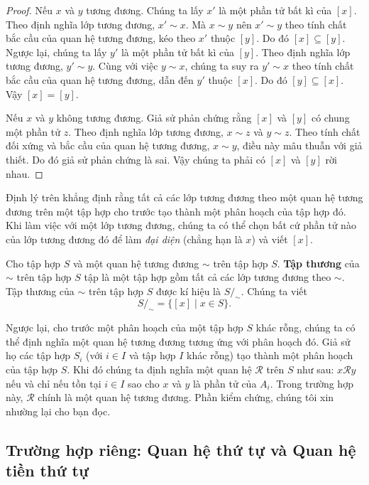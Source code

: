 \begin{proof}
    Nếu $x$ và $y$ tương đương. Chúng ta lấy $x'$ là một phần tử bất kì của $[x]$. Theo định nghĩa lớp tương đương, $x'\sim x$. Mà $x\sim y$ nên $x'\sim y$ theo tính chất bắc cầu của quan hệ tương đương, kéo theo $x'$ thuộc $[y]$. Do đó $[x]\subseteq [y]$. Ngược lại, chúng ta lấy $y'$ là một phần tử bất kì của $[y]$. Theo định nghĩa lớp tương đương, $y'\sim y$. Cùng với việc $y\sim x$, chúng ta suy ra $y'\sim x$ theo tính chất bắc cầu của quan hệ tương đương, dẫn đến $y'$ thuộc $[x]$. Do đó $[y]\subseteq [x]$. Vậy $[x] = [y]$.

    Nếu $x$ và $y$ không tương đương. Giả sử phản chứng rằng $[x]$ và $[y]$ có chung một phần tử $z$. Theo định nghĩa lớp tương đương, $x\sim z$ và $y\sim z$. Theo tính chất đối xứng và bắc cầu của quan hệ tương đương, $x\sim y$, điều này mâu thuẫn với giả thiết. Do đó giả sử phản chứng là sai. Vậy chúng ta phải có $[x]$ và $[y]$ rời nhau.
\end{proof}

Định lý trên khẳng định rằng tất cả các lớp tương đương theo một quan hệ tương đương trên một tập hợp cho trước tạo thành một phân hoạch của tập hợp đó. Khi làm việc với một lớp tương đương, chúng ta có thể chọn bất cứ phần tử nào của lớp tương đương đó để làm \textit{đại diện} (chẳng hạn là $x$) và viết $[x]$.

\begin{definition}
    Cho tập hợp $S$ và một quan hệ tương đương $\sim$ trên tập hợp $S$. \@\textbf{Tập thương} của $\sim$ trên tập hợp $S$ tập là một tập hợp gồm tất cả các lớp tương đương theo $\sim$. Tập thương của $\sim$ trên tập hợp $S$ được kí hiệu là $S/_{\sim}$. Chúng ta viết
    \[
        S/_{\sim} = \{ [x] \mid x\in S \}.
    \]
\end{definition}

Ngược lại, cho trước một phân hoạch của một tập hợp $S$ khác rỗng, chúng ta có thể định nghĩa một quan hệ tương đương tương ứng với phân hoạch đó. Giả sử họ các tập hợp $S_{i}$ (với $i\in I$ và tập hợp $I$ khác rỗng) tạo thành một phân hoạch của tập hợp $S$. Khi đó chúng ta định nghĩa một quan hệ $\mathscr{R}$ trên $S$ như sau: $x\mathscr{R}y$ nếu và chỉ nếu tồn tại $i\in I$ sao cho $x$ và $y$ là phần tử của $A_{i}$. Trong trường hợp này, $\mathscr{R}$ chính là một quan hệ tương đương. Phần kiểm chứng, chúng tôi xin nhường lại cho bạn đọc.

\subsection{Trường hợp riêng: Quan hệ thứ tự và Quan hệ tiền thứ tự}\label{subsection:order-and-preorder-relations}

